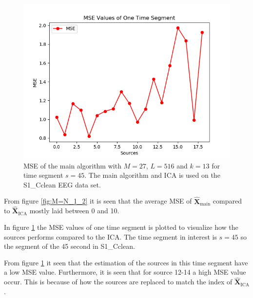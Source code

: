 \noindent 
 
\begin{figure}[H]
\centering
\includegraphics[scale=0.5]{figures/ch_7/MSE_M=N.png}
\caption{MSE of the main algorithm with $M=27$, $L = 516$ and $k=13$ for time segment $s=45$. The main algorithm and ICA is used on the S1\_Cclean EEG data set.}
\label{fig:M=N_2}
\end{figure}
\noindent
From figure \ref{fig:M=N_1_2} it is seen that the average MSE of $\hat{\mathbf{X}}_{\text{main}}$ compared to $\hat{\mathbf{X}}_{\text{ICA}}$ mostly laid between 0 and 10. 

In figure \ref{fig:M=N_2} the MSE values of one time segment is plotted to visualize how the sources performs compared to the ICA. The time segment in interest is $s = 45$ so the segment of the 45 second in S1\_Cclean. 

From figure \ref{fig:M=N_2} it seen that the estimation of the sources in this time segment have a low MSE value. Furthermore, it is seen that for source 12-14 a high MSE value occur. This is because of how the sources are replaced to match the index of $\hat{\mathbf{X}}_{\text{ICA}}$.

